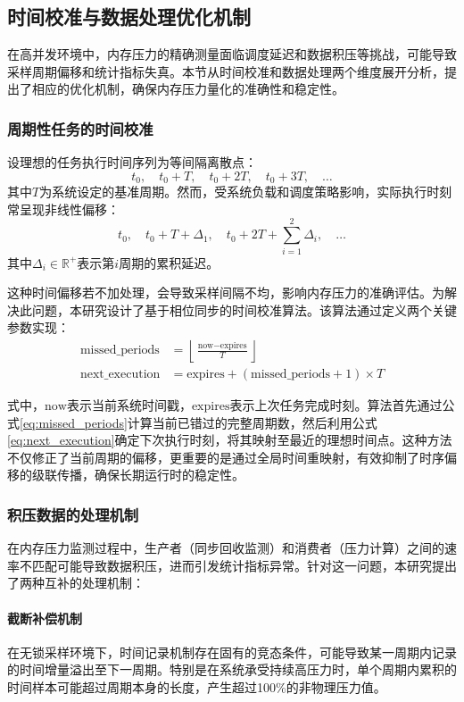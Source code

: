 \subsection{时间校准与数据处理优化机制}
\label{sec:time_calibration_and_data_processing}
在高并发环境中，内存压力的精确测量面临调度延迟和数据积压等挑战，可能导致采样周期偏移和统计指标失真。本节从时间校准和数据处理两个维度展开分析，提出了相应的优化机制，确保内存压力量化的准确性和稳定性。

\subsubsection{周期性任务的时间校准}

设理想的任务执行时间序列为等间隔离散点：
\[
t_0, \quad t_0 + T, \quad t_0 + 2T, \quad t_0 + 3T, \quad \dots
\]
其中\(T\)为系统设定的基准周期。然而，受系统负载和调度策略影响，实际执行时刻常呈现非线性偏移：
\[
t_0, \quad t_0 + T + \Delta_1, \quad t_0 + 2T + \sum_{i=1}^2\Delta_i, \quad \dots
\]
其中\(\Delta_i \in \mathbb{R}^+\)表示第\(i\)周期的累积延迟。

这种时间偏移若不加处理，会导致采样间隔不均，影响内存压力的准确评估。为解决此问题，本研究设计了基于相位同步的时间校准算法。该算法通过定义两个关键参数实现：
\begin{align}
    \text{missed\_periods} &= \left\lfloor \frac{\text{now} - \text{expires}}{T} \right\rfloor
    \label{eq:missed_periods} \\
    \text{next\_execution} &= \text{expires} + (\text{missed\_periods} + 1) \times T
    \label{eq:next_execution}
\end{align}

式中，\(\text{now}\)表示当前系统时间戳，\(\text{expires}\)表示上次任务完成时刻。算法首先通过公式\ref{eq:missed_periods}计算当前已错过的完整周期数，然后利用公式\ref{eq:next_execution}确定下次执行时刻，将其映射至最近的理想时间点。这种方法不仅修正了当前周期的偏移，更重要的是通过全局时间重映射，有效抑制了时序偏移的级联传播，确保长期运行时的稳定性。

\subsubsection{积压数据的处理机制}

在内存压力监测过程中，生产者（同步回收监测）和消费者（压力计算）之间的速率不匹配可能导致数据积压，进而引发统计指标异常。针对这一问题，本研究提出了两种互补的处理机制：

\paragraph{截断补偿机制} \quad 在无锁采样环境下，时间记录机制存在固有的竞态条件，可能导致某一周期内记录的时间增量溢出至下一周期。特别是在系统承受持续高压力时，单个周期内累积的时间样本可能超过周期本身的长度，产生超过100\%的非物理压力值。

